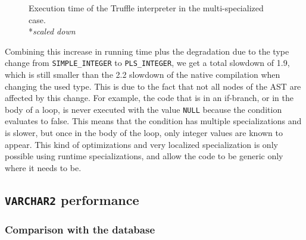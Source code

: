 \documentclass[twoside,11pt,a4paper]{article}
\newcommand{\pls}[1]{\small\texttt{#1}\normalsize}
\newcommand{\plstype}[1]{\pls{#1}}
\newcommand{\varchar}{\plstype{VARCHAR2}}
\newcommand{\plsi}{\plstype{PLS\_INTEGER}}
\newcommand{\simpleint}{\plstype{SIMPLE\_INTEGER}}
\newcommand{\plsnull}{\pls{NULL}}
\begin{document}
\begin{figure}[tp]
	\centering
	\caption[Execution time of the Truffle interpreter in the multi-specialized case]{Execution time of the Truffle interpreter in the multi-specialized case.\\ 			\hspace*{2cm}*\textit{scaled down}}
	\label{fig:exp2b}
\end{figure}

Combining this increase in running time plus the degradation due to the type change from \simpleint{} to \plsi{}, we get a total slowdown of 1.9, which is still smaller than the 2.2 slowdown of the native compilation when changing the used type. This is due to the fact that not all nodes of the AST are affected by this change. For example, the code that is in an if-branch, or in the body of a loop, is never executed with the value \plsnull{} because the condition evaluates to false. This means that the condition has multiple specializations and is slower, but once in the body of the loop, only integer values are known to appear. This kind of optimizations and very localized specialization is only possible using runtime specializations, and allow the code to be generic only where it needs to be.


\subsection{\varchar{} performance}

\subsubsection{Comparison with the database}

\end{document}
